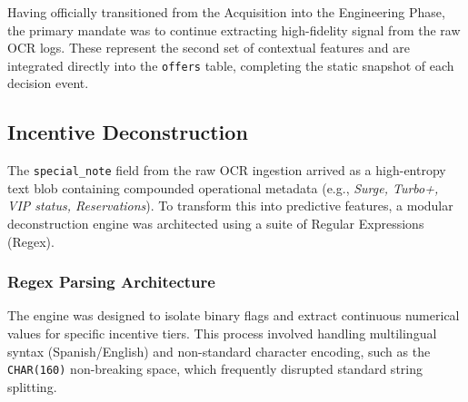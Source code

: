 Having officially transitioned from the Acquisition into the Engineering Phase, the primary mandate was to continue extracting high-fidelity signal from the raw OCR logs. These represent the second set of contextual features and are integrated directly into the \texttt{offers} table, completing the static snapshot of each decision event.


\subsection{Incentive Deconstruction}
The \texttt{special\_note} field from the raw OCR ingestion arrived as a high-entropy text blob containing compounded operational metadata (e.g., \textit{Surge, Turbo+, VIP status, Reservations}). To transform this into predictive features, a modular deconstruction engine was architected using a suite of Regular Expressions (Regex).

\subsubsection{Regex Parsing Architecture}
The engine was designed to isolate binary flags and extract continuous numerical values for specific incentive tiers. This process involved handling multilingual syntax (Spanish/English) and non-standard character encoding, such as the \texttt{CHAR(160)} non-breaking space, which frequently disrupted standard string splitting.

